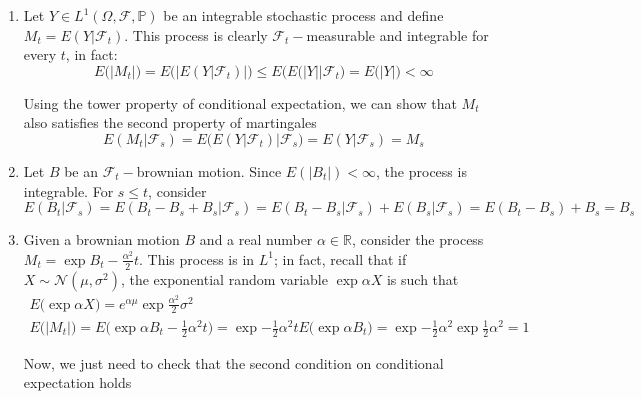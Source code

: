 \begin{enumerate}
    \item Let $Y \in L^1(\Omega,\mathcal{F},\mathbb{P})$ be an integrable stochastic process and define $M_t = E(Y \vert \mathcal{F}_t)$. This process is clearly $\mathcal{F}_t-$measurable and integrable for every $t$, in fact:
    \begin{equation*}
        E\big( \vert M_t\vert \big) = E\Big( \big\vert E(Y \vert \mathcal{F}_t) \big\vert \Big) \leq E\Big( E\big( \vert Y \vert \big\vert \mathcal{F}_t \Big) = E\big( \vert Y \vert \big) < \infty 
    \end{equation*}

    Using the tower property of conditional expectation, we can show that $M_t$ also satisfies the second property of martingales
    \begin{equation*}
        E(M_t \vert \mathcal{F}_s) = E\big( E(Y \vert \mathcal{F}_t) \vert \mathcal{F}_s \big) = E(Y \vert \mathcal{F}_s) = M_s
    \end{equation*}

    \item Let $B$ be an $\mathcal{F}_t-$brownian motion. Since $E(\vert B_t \vert) < \infty$, the process is integrable. For $s \leq t$, consider 
    \begin{equation*}
        E(B_t \vert \mathcal{F}_s) = E(B_t-B_s+B_s \vert \mathcal{F}_s) = E(B_t-B_s \vert \mathcal{F}_s) + E(B_s \vert \mathcal{F}_s) = E(B_t-B_s)+B_s = B_s
    \end{equation*}

    \item Given a brownian motion $B$ and a real number $\alpha \in \mathbb{R}$, consider the process $M_t = \exp{B_t - \frac{\alpha^2}{2}t}$. This process is in $L^1$; in fact, recall that if $X \sim \mathcal{N}(\mu,\sigma^2)$, the exponential random variable $\exp{\alpha X}$ is such that  
    \begin{gather*}
        E\big(\exp{\alpha X} \big) = e^{\alpha \mu} \exp{\frac{\alpha^2}{2} \sigma^2} \\
        E\big( \vert M_t \vert \big) = E\Big( \exp{ \alpha B_t - \frac{1}{2}\alpha^2 t} \Big) = \exp{-\frac{1}{2}\alpha^2 t} E\Big( \exp{\alpha B_t} \Big) = \exp{-\frac{1}{2}\alpha^2} \exp{\frac{1}{2}\alpha^2} = 1
    \end{gather*}

    Now, we just need to check that the second condition on conditional expectation holds


\end{enumerate}
